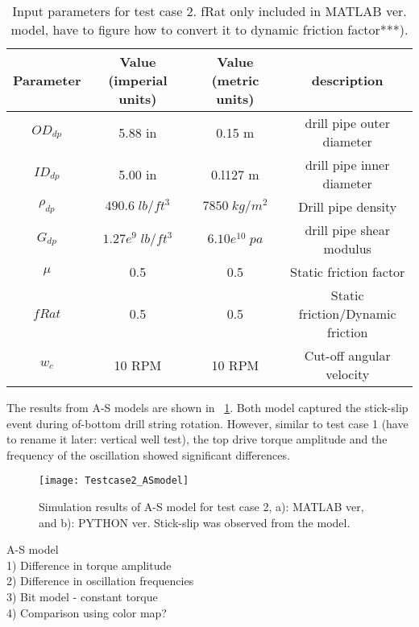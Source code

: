  \begin{table}[!hbt]
\centering
\begin{tabular}{|c|c|c|c|}
\hline
Parameter & Value (imperial units) & Value (metric units) & description\\                                                              
\hline
$OD_{dp}$ & 5.88 in & 0.15 m & drill pipe outer diameter\\                                                       
\hline
$ID_{dp}$ & 5.00 in & 0.l127 m & drill pipe inner diameter  \\                                                      
\hline
$\rho_{dp}$ & $490.6\;lb/ft^3$ & $7850\;kg/m^2$ & Drill pipe density \\                                                  
\hline
$G_{dp}$ & $1.27e^{9}\;lb/ft^3$ & $6.10e^{10}\;pa$ & drill pipe shear modulus\\                                                              
\hline
$\mu$ & 0.5 & 0.5 & Static friction factor\\
\hline
$fRat$ & 0.5 & 0.5 & Static friction/Dynamic friction\\
\hline
$w_c$ & 10 RPM & 10 RPM & Cut-off angular velocity\\
\hline
\end{tabular}
\caption[Input parameters for test case 2.]{Input parameters for test case 2. fRat only included in MATLAB ver. model, have to figure how to convert it to dynamic friction factor***).}\label{table_Inclinedwell_input}
\end{table}

The results from A-S models are shown in \figurename~\ref{figure_testcase2_ASmodel}. Both model captured the stick-slip event during of-bottom drill string rotation. However, similar to test case 1 (have to rename it later: vertical well test), the top drive torque amplitude and the frequency of the oscillation showed significant differences.
 
\begin{figure}[!hbt]
  \centering
  \texttt{[image: Testcase2\_ASmodel]}
  \caption[Result from A-S model. (test case 2)]{Simulation results of A-S model for test case 2, a): MATLAB ver, and b): PYTHON ver. Stick-slip was observed from the model.}\label{figure_testcase2_ASmodel}
\end{figure}

A-S model\\
1) Difference in torque amplitude\\
2) Difference in oscillation frequencies\\
3) Bit model - constant torque\\
4) Comparison using color map? \\

